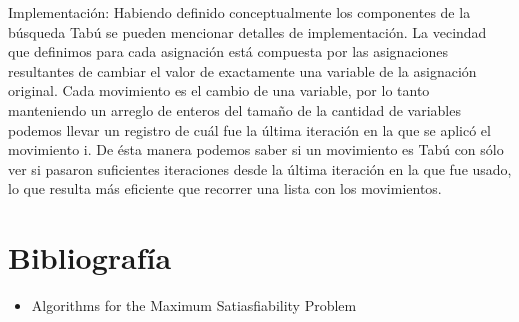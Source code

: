 \documentclass[a4paper,10pt]{article}
\begin{document}
Implementación:
Habiendo definido conceptualmente los componentes de la búsqueda Tabú se pueden mencionar detalles de implementación. 
La vecindad que definimos para cada asignación está compuesta por las asignaciones resultantes de cambiar el valor de exactamente una variable de la asignación original. Cada movimiento es el cambio de una variable, por lo tanto manteniendo un arreglo de enteros del tamaño de la cantidad de variables podemos llevar un registro de cuál fue la última iteración en la que se aplicó el movimiento i. De ésta manera podemos saber si un movimiento es Tabú con sólo ver si pasaron suficientes iteraciones desde la última iteración en la que fue usado, lo que resulta más eficiente que recorrer una lista con los movimientos. 












\section*{Bibliograf\'ia}

\begin{itemize}
\item Algorithms for the Maximum Satiasfiability Problem 
\end{itemize}
\end{document}
